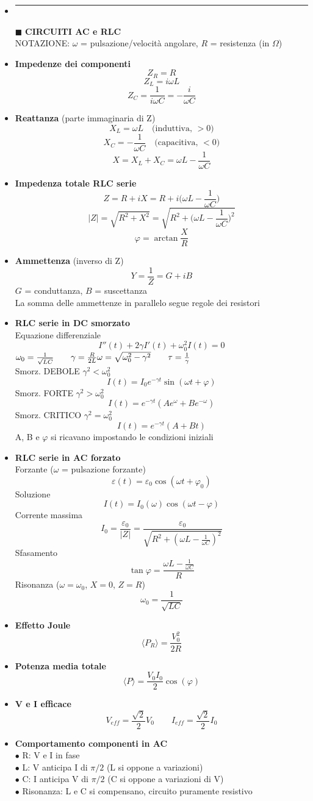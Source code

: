 \documentclass{book}
\newcommand{\g}{\textbf}
\newcommand{\e}{\begin{equation}}
\newcommand{\ex}{\end{equation} }
\renewcommand{\it}{\item[$\cdot$]}
\newcommand{\sep}{\item[]\rule{\linewidth}{0.4pt}}
\begin{document}
\begin{multicols}{4}
\begin{itemize}
\sep
\item [$\blacksquare$] \g{CIRCUITI AC e RLC} \\
    NOTAZIONE: $\omega$ = pulsazione/velocità angolare, $R$ = resistenza (in $\Omega$)
    \it \g{Impedenze dei componenti}
        \e{Z_R=R}\ex
        \e{Z_L=i\omega L}\ex
        \e{Z_C=\frac{1}{i\omega C}=-\frac{i}{\omega C}}\ex
    \it \g{Reattanza} (parte immaginaria di Z)
        \e{X_L=\omega L \quad \text{(induttiva, }>0\text{)}}\ex
        \e{X_C=-\frac{1}{\omega C} \quad \text{(capacitiva, }<0\text{)}}\ex
        \e{X=X_L+X_C=\omega L-\frac{1}{\omega C}}\ex
    \it \g{Impedenza totale RLC serie}
        \e{Z=R+iX=R+i\biggl(\omega L-\frac{1}{\omega C}\biggr)}\ex
        \e{|Z|=\sqrt{R^2+X^2}=\sqrt{R^2+\biggl(\omega L-\frac{1}{\omega C}\biggr)^2}}\ex
        \e{\varphi=\arctan\frac{X}{R}}\ex
    \it \g{Ammettenza} (inverso di Z)
        \e{Y=\frac{1}{Z}=G+iB}\ex
        $G$ = conduttanza, $B$ = suscettanza \\
        La somma delle ammettenze in parallelo segue regole dei resistori \\
    \it \g{RLC serie in DC smorzato} \\
    Equazione differenziale
    \e{I''(t)+2\gamma I'(t)+\omega_0^2 I(t)=0} \ex
        $\omega_0=\frac{1}{\sqrt{LC}} \qquad \gamma=\frac{R}{2L} \\
        \omega=\sqrt{\omega_0^2-\gamma^2} \qquad \tau=\frac{1}{\gamma}$ \\
        Smorz. DEBOLE $\gamma^2<\omega_0^2$
        \e{I(t)=I_0 e^{-\gamma t} \sin(\omega t+\varphi)} \ex
        Smorz. FORTE $\gamma^2>\omega_0^2$
        \e{I(t)=e^{-\gamma t}(Ae^\omega+Be^{-\omega})} \ex
        Smorz. CRITICO $\gamma^2=\omega_0^2$
        \e{I(t)=e^{-\gamma t}(A+Bt)} \ex
        A, B e $\varphi$ si ricavano impostando le condizioni iniziali
    \it \g{RLC serie in AC forzato} \\
        Forzante ($\omega$ = pulsazione forzante)
        \e{\varepsilon(t)=\varepsilon_0\cos(\omega t + \varphi_0)} \ex
        Soluzione
        \e{I(t)=I_0(\omega)\cos(\omega t - \varphi)} \ex
        Corrente massima
        \e{I_0=\frac{\varepsilon_0}{|Z|}=\frac{\varepsilon_0}{\sqrt{R^2+(\omega L-\frac{1}{\omega C})^2}}} \ex
        Sfasamento
        \e{\tan\varphi=\frac{\omega L-\frac{1}{\omega C}}{R}} \ex
        Risonanza ($\omega=\omega_0$, $X=0$, $Z=R$)
        \e{\omega_0=\frac{1}{\sqrt{LC}}} \ex
    \it \g{Effetto Joule}
        \e{\langle P_R\rangle=\frac{V_0^2}{2R}} \ex
    \it \g{Potenza media totale}
        \e{\langle P\rangle=\frac{V_0I_0}{2}\cos(\varphi)} \ex
    \it \g{V e I efficace}
        \e{V_{eff}=\frac{\sqrt{2}}{2}V_0 \qquad I_{eff}=\frac{\sqrt{2}}{2}I_0} \ex
    \it \g{Comportamento componenti in AC} \\
        $\bullet$ R: V e I in fase \\
        $\bullet$ L: V anticipa I di $\pi/2$ (L si oppone a variazioni) \\
        $\bullet$ C: I anticipa V di $\pi/2$ (C si oppone a variazioni di V) \\
        $\bullet$ Risonanza: L e C si compensano, circuito puramente resistivo \\


\end{itemize}
\end{multicols}
\end{document}
